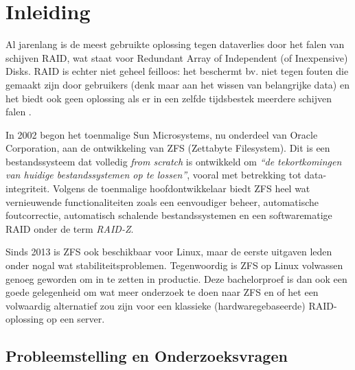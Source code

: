 
\chapter{Inleiding}
\label{ch:inleiding}

Al jarenlang is de meest gebruikte oplossing tegen dataverlies door het falen van schijven  RAID, wat staat voor Redundant Array of Independent (of Inexpensive) Disks. RAID is echter niet geheel feilloos: het beschermt bv. niet tegen fouten die gemaakt zijn door gebruikers (denk maar aan het wissen van belangrijke data) en het biedt ook geen oplossing als er in een zelfde tijdsbestek meerdere schijven falen \autocite{Chen1994}.

In 2002 begon het toenmalige Sun Microsystems, nu onderdeel van Oracle Corporation, aan de ontwikkeling van ZFS (Zettabyte Filesystem). Dit is een bestandssysteem dat volledig \textit{from scratch} is ontwikkeld om \textit{``de tekortkomingen van huidige bestandssystemen op te lossen''}\autocite{JeffBonwick_lastZFS}, vooral met betrekking tot data-integriteit. Volgens de toenmalige hoofdontwikkelaar \textcite{ZFSBonwick} biedt ZFS heel wat vernieuwende functionaliteiten zoals een eenvoudiger beheer, automatische foutcorrectie, automatisch schalende bestandssystemen en een softwarematige RAID onder de term \textit{RAID-Z}. 

Sinds 2013 is ZFS ook beschikbaar voor Linux, maar de eerste uitgaven leden onder nogal wat stabiliteitsproblemen. Tegenwoordig is ZFS op Linux volwassen genoeg geworden om in te zetten in productie. Deze bachelorproef is dan ook een goede gelegenheid om wat meer onderzoek te doen naar ZFS en of het een volwaardig alternatief zou zijn voor een klassieke (hardwaregebaseerde) RAID-oplossing op een server.

\section{Probleemstelling en Onderzoeksvragen}
\label{sec:onderzoeksvragen}


